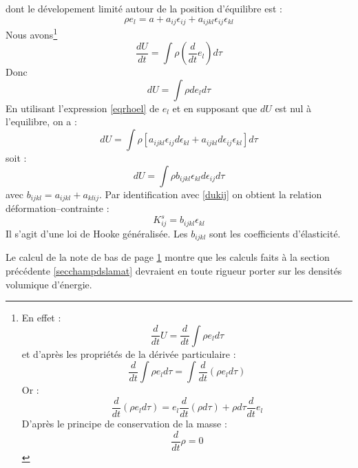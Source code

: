 \documentclass[12pt]{book}
\begin{document}
dont le d\'evelopement limit\'e autour de la position d'\'equilibre
est :
\begin{equation}\label{eqrhoel}
\rho e_l=a+a_{ij}\epsilon_{ij}+a_{ijkl}\epsilon_{ij}\epsilon_{kl}
\end{equation}
Nous avons\footnote{\label{footdensi}En effet :%
\begin{equation}
\frac{d}{dt}U=\frac{d}{dt}\int \rho e_l d\tau
\end{equation}
et d'apr\`es les propri\'et\'es de la d\'eriv\'ee particulaire :
\begin{equation}
\frac{d}{dt}\int \rho e_l d\tau=\int\frac{d}{dt}( \rho e_l d\tau)
\end{equation}
Or :
\begin{equation}
\frac{d}{dt} (\rho e_ld\tau)=e_l\frac{d}{dt} (\rho d\tau) + \rho
d\tau\frac{d}{dt}e_l 
\end{equation}
D'apr\`es le principe de conservation de la masse :
\begin{equation}
\frac{d}{dt} \rho=0
\end{equation}
}%
\begin{equation}\label{eqdudt}
\frac{dU}{dt}=\int \rho (\frac{d}{dt}e_l) d\tau
\end{equation}
Donc
\begin{equation}
dU=\int \rho de_l d\tau
\end{equation}
En utilisant l'expression \ref{eqrhoel} de $e_l$ et en supposant que
$dU$ est nul \`a l'equilibre, on a :
\begin{equation}
dU=\int \rho  [a_{ijkl}\epsilon_{ij}d\epsilon_{kl}+
a_{ijkl}d\epsilon_{ij}\epsilon_{kl}]d\tau 
\end{equation}
soit :
\begin{equation}
dU=\int \rho  b_{ijkl}\epsilon_{kl}d\epsilon_{ij}d\tau
\end{equation}
avec $b_{ijkl}=a_{ijkl}+a_{klij}$. Par identification avec
\ref{dukij} on obtient la relation d\'eformation--contrainte :
\begin{equation}
K_{ij}^s=b_{ijkl}\epsilon_{kl}
\end{equation}
Il s'agit d'une loi de Hooke g\'en\'eralis\'ee. Les $b_{ijkl}$ sont
les coefficients d'\'elasticit\'e. 
\begin{rem}
Le calcul de la note de bas de page \ref{footdensi} montre que les calculs
faits \`a la 
section pr\'ec\'edente \ref{secchampdslamat}
devraient en toute rigueur porter sur les densit\'es volumique d'\'energie.
\end{rem}
\end{document}
